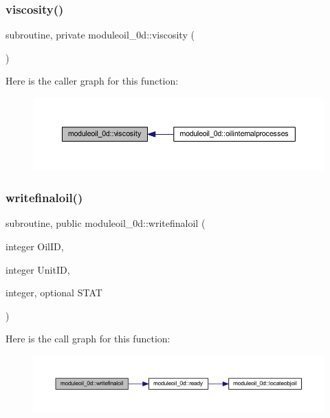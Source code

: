 \subsubsection{\texorpdfstring{viscosity()}{viscosity()}}
{\footnotesize\ttfamily subroutine, private moduleoil\+\_\+0d\+::viscosity (\begin{DoxyParamCaption}{ }\end{DoxyParamCaption})\hspace{0.3cm}{\ttfamily [private]}}

Here is the caller graph for this function\+:\nopagebreak
\begin{figure}[H]
\begin{center}
\leavevmode
\includegraphics[width=350pt]{namespacemoduleoil__0d_aed2374d490605ee4791762d23340c037_icgraph}
\end{center}
\end{figure}
\mbox{\label{namespacemoduleoil__0d_ac8ffff6a84b585607cbd75e554459582}} 
\subsubsection{\texorpdfstring{writefinaloil()}{writefinaloil()}}
{\footnotesize\ttfamily subroutine, public moduleoil\+\_\+0d\+::writefinaloil (\begin{DoxyParamCaption}\item[{integer}]{Oil\+ID,  }\item[{integer}]{Unit\+ID,  }\item[{integer, optional}]{S\+T\+AT }\end{DoxyParamCaption})}

Here is the call graph for this function\+:\nopagebreak
\begin{figure}[H]
\begin{center}
\leavevmode
\includegraphics[width=350pt]{namespacemoduleoil__0d_ac8ffff6a84b585607cbd75e554459582_cgraph}
\end{center}
\end{figure}


